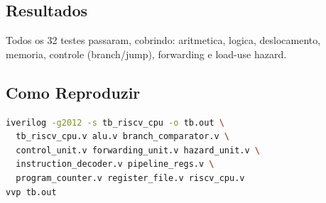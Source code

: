 \documentclass[12pt,a4paper]{article}
\begin{document}
\subsection{Resultados}
Todos os 32 testes passaram, cobrindo: aritmetica, logica, deslocamento,
memoria, controle (branch/jump), forwarding e load-use hazard.

\subsection{Como Reproduzir}
\begin{lstlisting}[language=bash]
iverilog -g2012 -s tb_riscv_cpu -o tb.out \
  tb_riscv_cpu.v alu.v branch_comparator.v \
  control_unit.v forwarding_unit.v hazard_unit.v \
  instruction_decoder.v pipeline_regs.v \
  program_counter.v register_file.v riscv_cpu.v
vvp tb.out
\end{lstlisting}
\end{document}
